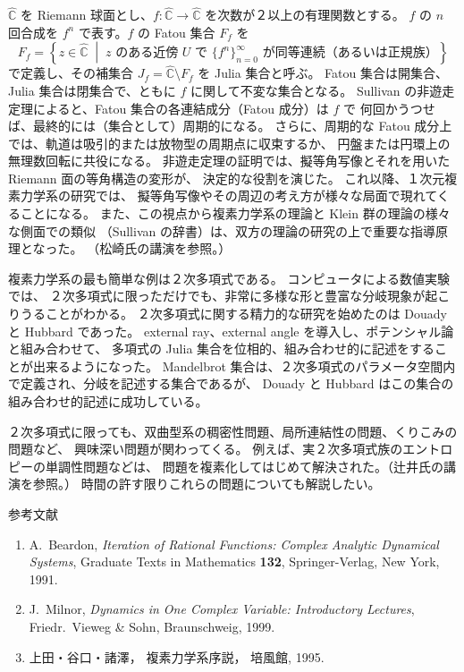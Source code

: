 \documentclass[uplatex,dvipdfmx]{jlreq}
\newcommand{\CC}{\widehat{\mathbb{C}}}
\begin{document}
$\CC$ を Riemann 球面とし、$f : \CC \to \CC$ を次数が２以上の有理関数とする。
$f$ の $n$ 回合成を $f^n$ で表す。$f$ の Fatou 集合 $F_f$ を
\[
  F_f = \left\{ z \in \CC \;\middle|\;
  z \text{ のある近傍 } U \text{ で }
  \{f^n\}_{n=0}^\infty \text{ が同等連続（あるいは正規族）}
  \right\}
\]
で定義し、その補集合 $J_f = \CC \setminus F_f$ を Julia 集合と呼ぶ。
Fatou 集合は開集合、Julia 集合は閉集合で、ともに $f$ に関して不変な集合となる。
Sullivan の非遊走定理によると、Fatou 集合の各連結成分（Fatou 成分）は $f$ で
何回かうつせば、最終的には（集合として）周期的になる。
さらに、周期的な Fatou 成分上では、軌道は吸引的または放物型の周期点に収束するか、
円盤または円環上の無理数回転に共役になる。
非遊走定理の証明では、擬等角写像とそれを用いた Riemann 面の等角構造の変形が、
決定的な役割を演じた。
これ以降、１次元複素力学系の研究では、
擬等角写像やその周辺の考え方が様々な局面で現れてくることになる。
また、この視点から複素力学系の理論と Klein 群の理論の様々な側面での類似
（Sullivan の辞書）は、双方の理論の研究の上で重要な指導原理となった。
（松崎氏の講演を参照。）

複素力学系の最も簡単な例は２次多項式である。
コンピュータによる数値実験では、
２次多項式に限っただけでも、非常に多様な形と豊富な分岐現象が起こりうることがわかる。
２次多項式に関する精力的な研究を始めたのは Douady と Hubbard であった。
external ray、external angle を導入し、ポテンシャル論と組み合わせて、
多項式の Julia 集合を位相的、組み合わせ的に記述をすることが出来るようになった。
Mandelbrot 集合は、２次多項式のパラメータ空間内で定義され、分岐を記述する集合であるが、
Douady と Hubbard はこの集合の組み合わせ的記述に成功している。

２次多項式に限っても、双曲型系の稠密性問題、局所連結性の問題、くりこみの問題など、
興味深い問題が関わってくる。
例えば、実２次多項式族のエントロピーの単調性問題などは、
問題を複素化してはじめて解決された。（辻井氏の講演を参照。）
時間の許す限りこれらの問題についても解説したい。

\vspace{1pc}

\begin{center}
  \textsc{参考文献}
\end{center}
\begin{enumerate}
  \item[{[B]}] A.~Beardon,
        \textit{Iteration of Rational Functions: Complex Analytic Dynamical Systems},
        Graduate Texts in Mathematics \textbf{132},
        Springer-Verlag, New York, 1991.
  \item[{[M]}] J.~Milnor,
        \textit{Dynamics in One Complex Variable: Introductory Lectures},
        Friedr.~Vieweg \& Sohn, Braunschweig, 1999.
  \item[{[UTM]}] 上田・谷口・諸澤，
        複素力学系序説，
        培風館, 1995.
\end{enumerate}
\end{document}
